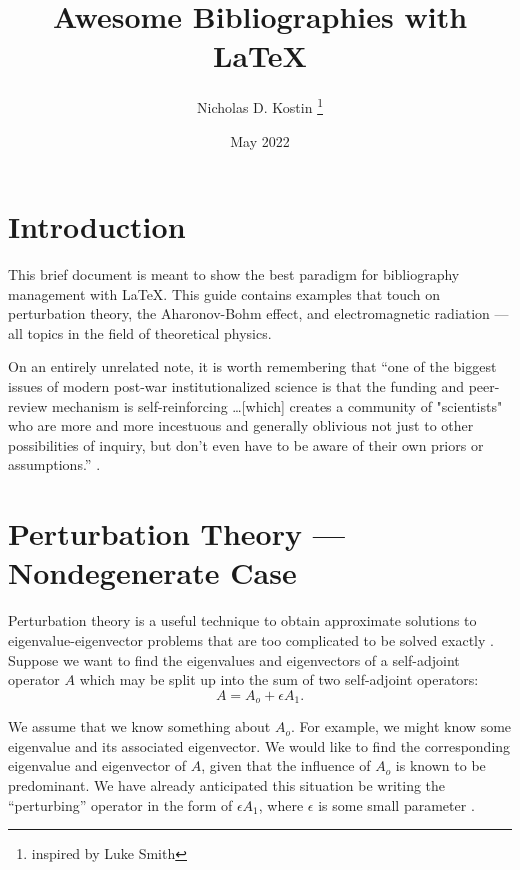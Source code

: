 \documentclass{article}
\title{Awesome Bibliographies with {\LaTeX}}
\author{Nicholas D. Kostin \thanks{inspired by Luke Smith}}
\date{May 2022}
\numberwithin{equation}{section}
\begin{document}
\begin{titlepage}
\maketitle
\end{titlepage}


\section{Introduction}

This brief document is meant to show the best paradigm for bibliography management with {\LaTeX}. This guide contains examples that touch on perturbation theory, the Aharonov-Bohm effect, and electromagnetic radiation --- all topics in the field of theoretical physics.

\vspace{1em}

On an entirely unrelated note, it is worth remembering that ``one of the biggest issues of modern post-war institutionalized science is that the funding and peer-review mechanism is self-reinforcing \ldots [which] creates a community of "scientists" who are more and more incestuous and generally oblivious not just to other possibilities of inquiry, but don't even have to be aware of their own priors or assumptions.'' \cite{fragile}. 

\section{Perturbation Theory --- Nondegenerate Case}

Perturbation theory is a useful technique to obtain approximate solutions to eigenvalue-eigenvector problems that are too complicated to be solved exactly \cite{byronfuller}. Suppose we want to find the eigenvalues and eigenvectors of a self-adjoint operator $A$ which may be split up into the sum of two self-adjoint operators:
\begin{equation*}
    A = A_o + \epsilon A_1.
\end{equation*}

We assume that we know something about $A_o$. For example, we might know some eigenvalue and its associated eigenvector. We would like to find the corresponding eigenvalue and eigenvector of $A$, given that the influence of $A_o$ is known to be predominant. We have already anticipated this situation be writing the ``perturbing'' operator in the form of $\epsilon A_1$, where $\epsilon$ is some small parameter \cite{byronfuller}.
\end{document}

